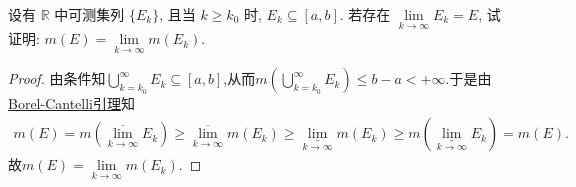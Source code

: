 \documentclass[../../main.tex]{subfiles}%
\begin{document}
\begin{example}
设有 $\mathbb{R}$ 中可测集列 $\{E_k\}$, 且当 $k\geqslant k_0$ 时, $E_k\subseteq[a,b]$. 若存在 $\lim\limits_{k\to\infty}E_k=E$, 试证明: $m(E)=\lim\limits_{k\to\infty}m(E_k)$.
\end{example}
\begin{proof}
由条件知$\bigcup\limits_{k=k_0}^{\infty}E_k\subseteq \left[ a,b \right]$,从而$m\left( \bigcup\limits_{k=k_0}^{\infty}E_k \right) \leqslant b-a<+\infty$.于是由\hyperref[theorem:Borel-Cantelli引理]{Borel-Cantelli引理}知
\begin{align*}
m\left( E \right) =m\left( \underset{k\rightarrow \infty}{\overline{\lim }}E_k \right) \geqslant \underset{k\rightarrow \infty}{\overline{\lim }}m\left( E_k \right) \geqslant \underset{k\rightarrow \infty}{\underline{\lim }}m\left( E_k \right) \geqslant m\left( \underset{k\rightarrow \infty}{\underline{\lim }}E_k \right) =m\left( E \right) .
\end{align*}
故$m\left( E \right) =\lim\limits_{k\rightarrow \infty}m\left( E_k \right).$
\end{proof}
\end{document}
